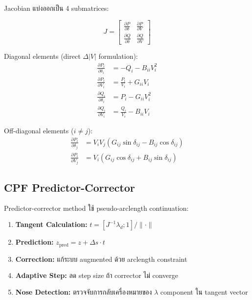\documentclass[12pt,a4paper]{article}
\begin{document}
Jacobian แบ่งออกเป็น 4 submatrices:

\begin{equation}
J = \begin{bmatrix}
\frac{\partial P}{\partial \delta} & \frac{\partial P}{\partial V} \\
\frac{\partial Q}{\partial \delta} & \frac{\partial Q}{\partial V}
\end{bmatrix}
\end{equation}

Diagonal elements (direct $\Delta|V|$ formulation):
\begin{align}
\frac{\partial P_i}{\partial \delta_i} &= -Q_i - B_{ii}V_i^2 \\
\frac{\partial P_i}{\partial V_i} &= \frac{P_i}{V_i} + G_{ii}V_i \\
\frac{\partial Q_i}{\partial \delta_i} &= P_i - G_{ii}V_i^2 \\
\frac{\partial Q_i}{\partial V_i} &= \frac{Q_i}{V_i} - B_{ii}V_i
\end{align}

Off-diagonal elements ($i \neq j$):
\begin{align}
\frac{\partial P_i}{\partial \delta_j} &= V_i V_j (G_{ij} \sin \delta_{ij} - B_{ij} \cos \delta_{ij}) \\
\frac{\partial P_i}{\partial V_j} &= V_i (G_{ij} \cos \delta_{ij} + B_{ij} \sin \delta_{ij})
\end{align}

\subsection{CPF Predictor-Corrector}

Predictor-corrector method ใช้ pseudo-arclength continuation:

\begin{enumerate}
    \item \textbf{Tangent Calculation:} $t = [J^{-1} \lambda_d; 1] / \| \cdot \|$
    \item \textbf{Prediction:} $z_{\text{pred}} = z + \Delta s \cdot t$
    \item \textbf{Correction:} แก้ระบบ augmented ด้วย arclength constraint
    \item \textbf{Adaptive Step:} ลด step size ถ้า corrector ไม่ converge
    \item \textbf{Nose Detection:} ตรวจจับการกลับเครื่องหมายของ $\lambda$ component ใน tangent vector
\end{enumerate}
\end{document}
